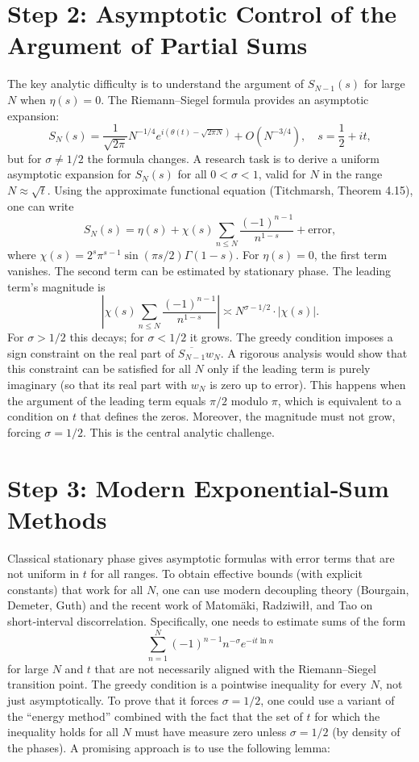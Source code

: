 \documentclass[12pt,a4paper]{article}
\begin{document}
\section{Step 2: Asymptotic Control of the Argument of Partial Sums}

The key analytic difficulty is to understand the argument of $S_{N-1}(s)$ for large $N$ when $\eta(s)=0$. The Riemann–Siegel formula provides an asymptotic expansion:
\[
S_N(s) = \frac{1}{\sqrt{2\pi}} N^{-1/4} e^{i(\theta(t)-\sqrt{2\pi N})} + O(N^{-3/4}),\quad s=\frac12+it,
\]
but for $\sigma\neq1/2$ the formula changes. A research task is to derive a uniform asymptotic expansion for $S_N(s)$ for all $0<\sigma<1$, valid for $N$ in the range $N\approx \sqrt{t}$. Using the approximate functional equation (Titchmarsh, Theorem 4.15), one can write
\[
S_N(s) = \eta(s) + \chi(s)\sum_{n\le N} \frac{(-1)^{n-1}}{n^{1-s}} + \text{error},
\]
where $\chi(s)=2^{s}\pi^{s-1}\sin(\pi s/2)\Gamma(1-s)$. For $\eta(s)=0$, the first term vanishes. The second term can be estimated by stationary phase. The leading term’s magnitude is
\[
\left|\chi(s)\sum_{n\le N} \frac{(-1)^{n-1}}{n^{1-s}}\right| \asymp N^{\sigma-1/2}\cdot |\chi(s)|.
\]
For $\sigma>1/2$ this decays; for $\sigma<1/2$ it grows. The greedy condition imposes a sign constraint on the real part of $\overline{S_{N-1}}w_N$. A rigorous analysis would show that this constraint can be satisfied for all $N$ only if the leading term is purely imaginary (so that its real part with $w_N$ is zero up to error). This happens when the argument of the leading term equals $\pi/2$ modulo $\pi$, which is equivalent to a condition on $t$ that defines the zeros. Moreover, the magnitude must not grow, forcing $\sigma=1/2$. This is the central analytic challenge.

\section{Step 3: Modern Exponential‑Sum Methods}

Classical stationary phase gives asymptotic formulas with error terms that are not uniform in $t$ for all ranges. To obtain effective bounds (with explicit constants) that work for all $N$, one can use modern decoupling theory (Bourgain, Demeter, Guth) and the recent work of Matomäki, Radziwiłł, and Tao on short‑interval discorrelation. Specifically, one needs to estimate sums of the form
\[
\sum_{n=1}^N (-1)^{n-1} n^{-\sigma} e^{-it\ln n}
\]
for large $N$ and $t$ that are not necessarily aligned with the Riemann–Siegel transition point. The greedy condition is a pointwise inequality for every $N$, not just asymptotically. To prove that it forces $\sigma=1/2$, one could use a variant of the “energy method” combined with the fact that the set of $t$ for which the inequality holds for all $N$ must have measure zero unless $\sigma=1/2$ (by density of the phases). A promising approach is to use the following lemma:
\end{document}

